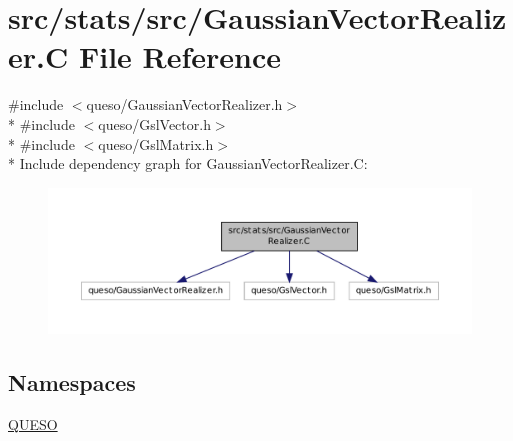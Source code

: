 \hypertarget{_gaussian_vector_realizer_8_c}{\section{src/stats/src/\-Gaussian\-Vector\-Realizer.C File Reference}
\label{_gaussian_vector_realizer_8_c}
}
{\ttfamily \#include $<$queso/\-Gaussian\-Vector\-Realizer.\-h$>$}\\*
{\ttfamily \#include $<$queso/\-Gsl\-Vector.\-h$>$}\\*
{\ttfamily \#include $<$queso/\-Gsl\-Matrix.\-h$>$}\\*
Include dependency graph for Gaussian\-Vector\-Realizer.\-C\-:
\nopagebreak
\begin{figure}[H]
\begin{center}
\leavevmode
\includegraphics[width=350pt]{_gaussian_vector_realizer_8_c__incl}
\end{center}
\end{figure}
\subsection*{Namespaces}
\begin{DoxyCompactItemize}
\item 
\hyperlink{namespace_q_u_e_s_o}{Q\-U\-E\-S\-O}
\end{DoxyCompactItemize}

